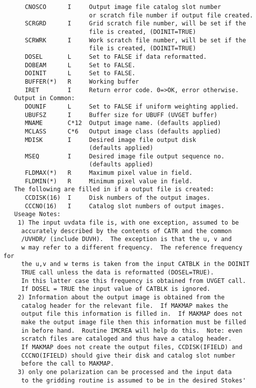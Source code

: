 \begin{verbatim}
      CNOSCO      I     Output image file catalog slot number
                        or scratch file number if output file created.
      SCRGRD      I     Grid scratch file number, will be set if the
                        file is created, (DOINIT=TRUE)
      SCRWRK      I     Work scratch file number, will be set if the
                        file is created, (DOINIT=TRUE)
      DOSEL       L     Set to FALSE if data reformatted.
      DOBEAM      L     Set to FALSE.
      DOINIT      L     Set to FALSE.
      BUFFER(*)   R     Working buffer
      IRET        I     Return error code. 0=>OK, error otherwise.
   Output in Common:
      DOUNIF      L     Set to FALSE if uniform weighting applied.
      UBUFSZ      I     Buffer size for UBUFF (UVGET buffer)
      MNAME       C*12  Output image name. (defaults applied)
      MCLASS      C*6   Output image class (defaults applied)
      MDISK       I     Desired image file output disk
                        (defaults applied)
      MSEQ        I     Desired image file output sequence no.
                        (defaults applied)
      FLDMAX(*)   R     Maximum pixel value in field.
      FLDMIN(*)   R     Minimum pixel value in field.
   The following are filled in if a output file is created:
      CCDISK(16)  I     Disk numbers of the output images.
      CCCNO(16)   I     Catalog slot numbers of output images.
   Useage Notes:
    1) The input uvdata file is, with one exception, assumed to be
     accurately described by the contents of CATR and the common
     /UVHDR/ (include DUVH).  The exception is that the u, v and
     w may refer to a different frequency.  The reference frequency for
     the u,v and w terms is taken from the input CATBLK in the DOINIT
     TRUE call unless the data is reformatted (DOSEL=TRUE).
     In this latter case this frequency is obtained from UVGET call.
     If DOSEL = TRUE the input value of CATBLK is ignored.
    2) Information about the output image is obtained from the
     catalog header for the relevant file.  If MAKMAP makes the
     output file this information is filled in.  If MAKMAP does not
     make the output image file then this information must be filled
     in before hand.  Routine IMCREA will help do this.  Note: even
     scratch files are cataloged and thus have a catalog header.
     If MAKMAP does not create the output files, CCDISK(IFIELD) and
     CCCNO(IFIELD) should give their disk and catalog slot number
     before the call to MAKMAP.
    3) only one polarization can be processed and the input data
     to the gridding routine is assumed to be in the desired Stokes'

\end{verbatim}
